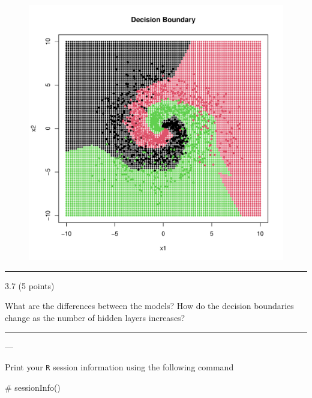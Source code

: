 \documentclass[
  letterpaper,
  DIV=11,
  numbers=noendperiod]{scrartcl}
\newenvironment{Shaded}{\begin{snugshade}}{\end{snugshade}}
\newcommand{\CommentTok}[1]{\textcolor[rgb]{0.37,0.37,0.37}{#1}}
\begin{document}
\begin{figure}[H]

{\centering \includegraphics{hw5_files/figure-pdf/unnamed-chunk-37-2.pdf}

}

\end{figure}

\begin{center}\rule{0.5\linewidth}{0.5pt}\end{center}

3.7 (5 points)

What are the differences between the models? How do the decision
boundaries change as the number of hidden layers increases?

\begin{center}\rule{0.5\linewidth}{0.5pt}\end{center}

\pagebreak

---

\begin{tcolorbox}[enhanced jigsaw, bottomtitle=1mm, rightrule=.15mm, left=2mm, colback=white, opacityback=0, bottomrule=.15mm, titlerule=0mm, toprule=.15mm, colframe=quarto-callout-note-color-frame, arc=.35mm, colbacktitle=quarto-callout-note-color!10!white, breakable, leftrule=.75mm, coltitle=black, title=\textcolor{quarto-callout-note-color}{\faInfo}\hspace{0.5em}{Session Information}, opacitybacktitle=0.6, toptitle=1mm]

Print your \texttt{R} session information using the following command

\begin{Shaded}
\begin{Highlighting}[]
\CommentTok{\# sessionInfo()}
\end{Highlighting}
\end{Shaded}

\end{tcolorbox}
\end{document}
